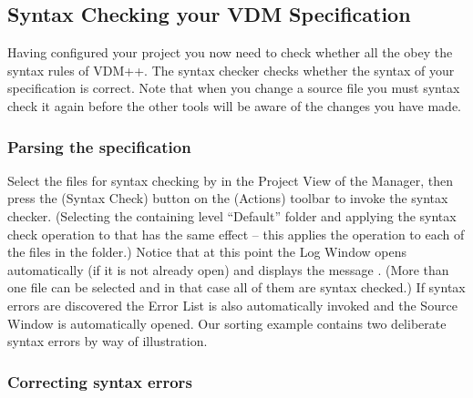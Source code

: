 \documentclass[\pformat,12pt]{article}
\newcommand{\vdmslpp}{VDM++}
\newcommand{\guicmd}[1]{{\sf #1}}
\begin{document}
\subsection{Syntax Checking your VDM Specification}

Having configured your project you now need to check whether all the
 obey the syntax rules
of \vdmslpp.  The syntax checker checks whether the syntax of your
specification is correct. Note that when you change a source file you
must syntax check it again before the other tools will be aware of the
changes you have made.


\subsubsection{Parsing the specification}

Select the files for syntax checking by
 in the \guicmd{Project View}
of the \guicmd{Manager}, then press the 
(\guicmd{Syntax Check}) button on the (\guicmd{Actions})
toolbar to invoke the syntax checker. (Selecting the containing level
 ``Default'' folder and applying the syntax check operation to that
 has the same effect -- this applies the operation to each of the
 files in the folder.) Notice that at this point the
\guicmd{Log Window} opens automatically (if it is not already open)
and displays the message 
.
(More than one file can be selected and
  in that case all of them are syntax checked.) If syntax
  errors are discovered the \guicmd{Error List} is
also au\-to\-matically invoked and the \guicmd{Source Window} is
automatically opened. Our sorting example contains two
deliberate syntax errors by way of illustration.


\subsubsection{Correcting syntax errors}
\end{document}
